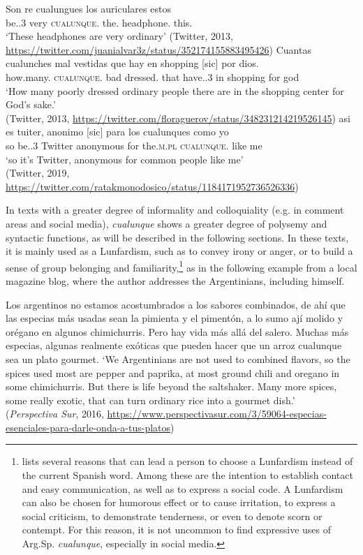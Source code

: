 \documentclass[output=paper,colorlinks,citecolor=brown]{langscibook}
\begin{document}
\ea\label{ex:fk28}
\gll Son re cualungues los auriculares estos\\
be.{\PRS.3\PL} very {\textsc{cualunque}.\PL} {the.\PL} {headphone.\PL} {this.\PL}\\
\glt ‘These headphones are very ordinary’ (Twitter, 2013, \url{https://twitter.com/juanialvar3z/status/352174155883495426})
\ex\label{ex:fk29}
\gll Cuantas cualunches mal vestidas que hay en {shopping [sic]} por dios.\\
{how.many.\PL} {\textsc{cualunque}.\PL} bad {dressed.\PL} that have.{\PRS.3\SG} in shopping for god\\
\glt ‘How many poorly dressed ordinary people there are in the shopping center for God’s sake.’\\
(Twitter, 2013, \url{https://twitter.com/floraguerov/status/348231214219526145})
\ex\label{ex:fk30}
\gll asi es tuiter, {anonimo [sic]} para los cualunques como yo\\
so be.{\PRS.3\SG} Twitter anonymous for the.\textsc{m.pl} {\textsc{cualunque}.\PL} like me \\
\glt ‘so it’s Twitter, anonymous for common people like me’\\
(Twitter, 2019, \url{https://twitter.com/ratakmonodosico/status/1184171952736526336})
\z

In texts with a greater degree of informality and colloquiality (e.g. in comment areas and social media), \textit{cualunque} shows a greater degree of polysemy and syntactic functions, as will be described in the following sections. In these texts, it is mainly used as a Lunfardism, such as to convey irony or anger, or to build a sense of group belonging and familiarity,\footnote{\citet[334f.]{Teruggi1974} lists several reasons that can lead a person to choose a Lunfardism instead of the current Spanish word. Among these are the intention to establish contact and easy communication, as well as to express a social code. A Lunfardism can also be chosen for humorous effect or to cause irritation, to express a social criticism, to demonstrate tenderness, or even to denote scorn or contempt. For this reason, it is not uncommon to find expressive uses of Arg.Sp. \textit{cualunque}, especially in social media.}  as in the following example from a local magazine blog, where the author addresses the Argentinians, including himself.

\ea\label{ex:fk31}
Los argentinos no estamos acostumbrados a los sabores combinados, de ahí que las especias más usadas sean la pimienta y el pimentón, a lo sumo ají molido y orégano en algunos chimichurris. Pero hay vida más allá del salero. Muchas más especias, algunas realmente exóticas que pueden hacer que un arroz cualunque sea un plato gourmet.
\glt ‘We Argentinians are not used to combined flavors, so the spices used most are pepper and paprika, at most ground chili and oregano in some chimichurris. But there is life beyond the saltshaker. Many more spices, some really exotic, that can turn ordinary rice into a gourmet dish.’\\
(\textit{Perspectiva Sur}, 2016, \url{https://www.perspectivasur.com/3/59064-especias-esenciales-para-darle-onda-a-tus-platos})
\z
\end{document}
